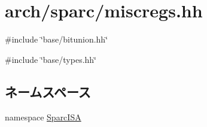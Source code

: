 \hypertarget{sparc_2miscregs_8hh}{
\section{arch/sparc/miscregs.hh}
\label{sparc_2miscregs_8hh}
}
{\ttfamily \#include \char`\"{}base/bitunion.hh\char`\"{}}\par
{\ttfamily \#include \char`\"{}base/types.hh\char`\"{}}\par
\subsection*{ネームスペース}
\begin{DoxyCompactItemize}
\item 
namespace \hyperlink{namespaceSparcISA}{SparcISA}
\end{DoxyCompactItemize}
